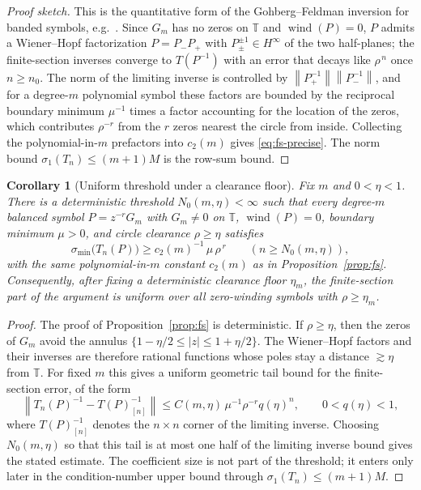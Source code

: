 \documentclass[11pt]{amsart}
\numberwithin{equation}{section}
\newtheorem{corollary}[theorem]{Corollary}
\theoremstyle{definition}
\theoremstyle{remark}
\newcommand{\T}{\mathbb T}
\newcommand{\wind}{\operatorname{wind}}
\newcommand{\smin}{\sigma_{\min}}
\newcommand{\norm}[1]{\left\lVert #1\right\rVert}
\begin{document}
\begin{proof}[Proof sketch]
This is the quantitative form of the Gohberg--Feldman inversion for banded symbols, e.g.\ \cite[Ch.~3 and Thm.~3.7]{BG}. Since $G_m$ has no zeros on $\T$ and \(\wind(P)=0\), $P$ admits a Wiener--Hopf factorization $P=P_-P_+$ with $P_\pm^{\pm1}\in H^\infty$ of the two half-planes; the finite-section inverses converge to $T(P^{-1})$ with an error that decays like $\rho^{\,n}$ once $n\ge n_0$. The norm of the limiting inverse is controlled by $\norm{P_+^{-1}}\norm{P_-^{-1}}$, and for a degree-$m$ polynomial symbol these factors are bounded by the reciprocal boundary minimum $\mu^{-1}$ times a factor accounting for the location of the zeros, which contributes $\rho^{-r}$ from the $r$ zeros nearest the circle from inside. Collecting the polynomial-in-$m$ prefactors into $c_2(m)$ gives \eqref{eq:fs-precise}. The norm bound $\sigma_1(T_n)\le(m+1)M$ is the row-sum bound.
\end{proof}

\begin{corollary}[Uniform threshold under a clearance floor]\label{prop:fs-uniform}
Fix \(m\) and \(0<\eta<1\).  There is a deterministic threshold
\(N_0(m,\eta)<\infty\) such that every degree-\(m\) balanced symbol \(P=z^{-r}G_m\)
with \(G_m\ne0\) on \(\T\), \(\wind(P)=0\), boundary minimum \(\mu>0\), and
circle clearance \(\rho\ge\eta\) satisfies
\[
  \smin\bigl(T_n(P)\bigr)\ge c_2(m)^{-1}\,\mu\,\rho^{\,r}
  \qquad(n\ge N_0(m,\eta)),
\]
with the same polynomial-in-\(m\) constant \(c_2(m)\) as in
Proposition~\ref{prop:fs}.  Consequently, after fixing a deterministic
clearance floor \(\eta_m\), the finite-section part of the argument is uniform
over all zero-winding symbols with \(\rho\ge\eta_m\).
\end{corollary}

\begin{proof}
The proof of Proposition~\ref{prop:fs} is deterministic.  If \(\rho\ge\eta\),
then the zeros of \(G_m\) avoid the annulus
\(\{1-\eta/2\le |z|\le1+\eta/2\}\).  The Wiener--Hopf factors and their inverses
are therefore rational functions whose poles stay a distance \(\gtrsim\eta\)
from \(\T\).  For fixed \(m\) this gives a uniform geometric tail bound for the
finite-section error, of the form
\[
  \norm{T_n(P)^{-1}-T(P)^{-1}_{[n]}}
  \le C(m,\eta)\,\mu^{-1}\rho^{-r}q(\eta)^n,
  \qquad 0<q(\eta)<1,
\]
where \(T(P)^{-1}_{[n]}\) denotes the \(n\times n\) corner of the limiting
inverse.  Choosing \(N_0(m,\eta)\) so that this tail is at most one half of the
limiting inverse bound gives the stated estimate.  The coefficient size is not
part of the threshold; it enters only later in the condition-number upper bound
through \(\sigma_1(T_n)\le(m+1)M\).
\end{proof}
\end{document}
